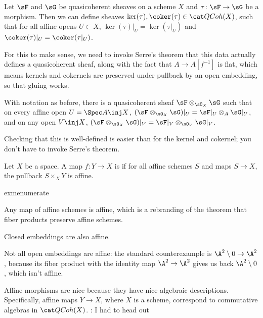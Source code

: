 \begin{defn}
Let $\sF$ and $\sG$ be quasicoherent sheaves on a scheme $X$ and $\tau\colon\sF\to\sG$ be a morphism. Then we can
define sheaves $\ker(\tau),\coker(\tau)\in\QCoh(X)$, such that for all affine opens $U\subset X$, $\ker(\tau)|_U
= \ker(\tau|_U)$ and $\coker(\tau)|_U = \coker(\tau|_U)$.
\end{defn}
For this to make sense, we need to invoke Serre's theorem that this data actually defines a quasicoherent sheaf,
along with the fact that $A\to A[f^{-1}]$ is flat, which means kernels and cokernels are preserved under
pullback by an open embedding, so that gluing works.
\begin{defn}
With notation as before, there is a quasicoherent sheaf $\sF\otimes_{\sO_X}\sG$ such that on every affine open $U =
\Spec A\inj X$, $(\sF\otimes_{\sO_X}\sG)|_U = \sF|_U\otimes_A \sG|_U$, and on any open $V\inj X$,
$(\sF\otimes_{\sO_X}\sG)|_V = \sF|_V\otimes_{\sO_V}\sG|_V$.
\end{defn}
Checking that this is well-defined is easier than for the kernel and cokernel; you don't have to invoke Serre's
theorem.
\begin{defn}
Let $X$ be a space. A map $f\colon Y\to X$ is  if for all affine schemes $S$ and maps $S\to X$, the
pullback $S\times_X Y$ is affine.
\end{defn}
\begin{comp}{exm}{enumerate}
	\item Any map of affine schemes is affine, which is a rebranding of the theorem that fiber products preserve
	affine schemes.
	\item Closed embeddings are also affine.
	\item Not all open embeddings are affne: the standard counterexample is $\A^2\setminus 0\to\A^2$, because its
	fiber product with the identity map $\A^2\to\A^2$ gives us back $\A^2\setminus 0$, which isn't affine.
	\qedhere
\end{comp}
Affine morphisms are nice because they have nice algebraic descriptions. Specifically, affine maps $Y\to X$, where
$X$ is a scheme, correspond to commutative algebras in $\QCoh(X)$. \TODO: I had to head out

